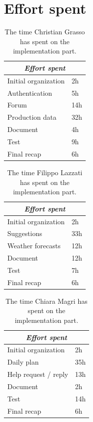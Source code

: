 \documentclass{article}
\begin{document}
\section{Effort spent}
\begin{longtable}{|m{5cm}|m{5cm}|}
\caption{The time Christian Grasso has spent on the implementation part.}
 \label{christian effort spent}
 \hline
 \multicolumn{2}{|c|}{\cellcolor{white}\emph{Effort spent}} \\
 \endfirsthead
 \endhead
 \endfoot
 \endlastfoot
 \hline
 Initial organization & 2h\\
 \hline
 Authentication & 5h\\
 \hline
 Forum & 14h\\
 \hline
  Production data & 32h\\
 \hline
  Document & 4h\\
 \hline  
 Test & 9h\\
 \hline
 Final recap & 6h\\
 \hline
\end{longtable}

\begin{longtable}{|m{5cm}|m{5cm}|}
\caption{The time Filippo Lazzati has spent on the implementation part.}
 \label{filippo effort spent}
 \hline
 \multicolumn{2}{|c|}{\cellcolor{white}\emph{Effort spent}} \\
 \endfirsthead
 \endhead
 \endfoot
 \endlastfoot
 \hline
 Initial organization & 2h\\
 \hline
 Suggestions & 33h\\
 \hline
 Weather forecasts & 12h\\
 \hline
 Document & 12h\\
 \hline  
 Test & 7h\\
 \hline
 Final recap & 6h\\
 \hline
\end{longtable}

\begin{longtable}{|m{5cm}|m{5cm}|}
\caption{The time Chiara Magri has spent on the implementation part.}
 \label{chiara effort spent}
 \hline
 \multicolumn{2}{|c|}{\cellcolor{white}\emph{Effort spent}} \\
 \endfirsthead
 \endhead
 \endfoot
 \endlastfoot
 \hline
 Initial organization & 2h\\
 \hline
 Daily plan & 35h\\
 \hline
 Help request / reply & 13h\\
 \hline
  Document & 2h\\
 \hline    
 Test & 14h\\
 \hline
 Final recap & 6h\\
 \hline
\end{longtable}
\newpage
\end{document}
